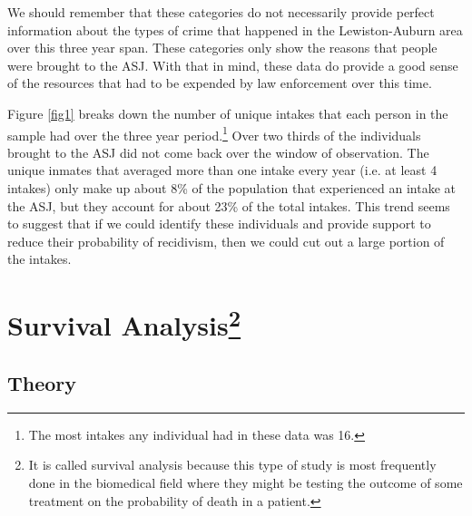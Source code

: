 \documentclass{article}
\begin{document}
We should remember that these categories do not necessarily provide perfect information about the types of crime that happened in the Lewiston-Auburn area over this three year span. These categories only show the reasons that people were brought to the ASJ. With that in mind, these data do provide a good sense of the resources that had to be expended by law enforcement over this time. 

Figure \ref{fig1} breaks down the number of unique intakes that each person in the sample had over the three year period.\footnote{The most intakes any individual had in these data was 16.} Over two thirds of the individuals brought to the ASJ did not come back over the window of observation. The unique inmates that averaged more than one intake every year (i.e. at least 4 intakes) only make up about 8\% of the population that experienced an intake at the ASJ, but they account for about 23\% of the total intakes. This trend seems to suggest that if we could identify these individuals and provide support to reduce their probability of recidivism, then we could cut out a large portion of the intakes. 

\section{Survival Analysis\footnote{It is called survival analysis because this type of study is most frequently done in the biomedical field where they might be testing the outcome of some treatment on the probability of death in a patient.}}

\subsection{Theory}
\end{document}
